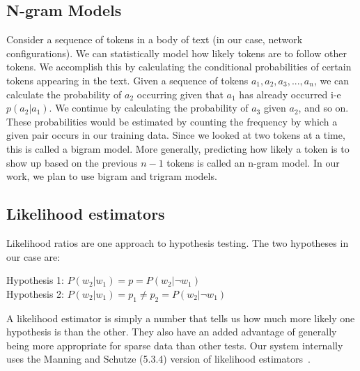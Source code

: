 \subsection{N-gram Models}

Consider a sequence of tokens in a body of text (in our case, network configurations). We can statistically model how likely tokens are to follow other tokens. We accomplish this by calculating the conditional probabilities of certain tokens appearing in the text. Given a sequence of tokens $a_1,a_2,a_3,...,a_n$, we can calculate the probability of $a_2$ occurring given that $a_1$ has already occurred i-e $p(a_2 | a_1)$. We continue by calculating the probability of $a_3$ given $a_2$, and so on. These probabilities would be estimated by counting the frequency by which a given pair occurs in our training data. Since we looked at two tokens at a time, this is called a bigram model. More generally, predicting how likely a token is to show up based on the previous $n-1$ tokens is called an n-gram model. In our work, we plan to use bigram and trigram models.

\subsection{Likelihood estimators} 

Likelihood ratios are one approach to hypothesis testing. The two hypotheses in our case are:

\begin{center}
Hypothesis 1: $P(w_2|w_1) = p = P(w_2|\neg w_1)$ \\
Hypothesis 2: $P(w_2|w_1) = p_1 \neq p_2 = P(w_2|\neg w_1)$	\\	
\end{center}

A likelihood estimator is simply a number that tells us how much more likely one hypothesis is than the other. They also have an added advantage of generally being more appropriate for sparse data than other tests. Our system internally uses the Manning and Schutze (5.3.4) version of likelihood estimators~\cite{manning}.
